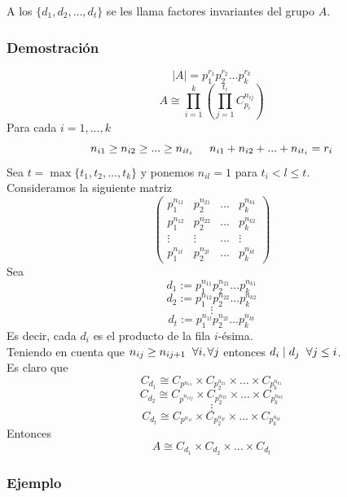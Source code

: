 \documentclass[11pt,a4paper]{article}
\begin{document}
A los $\{d_{1}, d_{2}, ..., d_{t}\}$ se les llama factores invariantes del grupo $A$.

\subsubsection*{Demostración}

$$|A| = p_{1}^{r_{1}} p_{2}^{r_{2}} ... p_{k}^{r_{k}}$$
$$A \cong \prod_{i=1}^{k} (\prod_{j=1}^{t_{i}} C_{p_{i}}^{n_{ij}})$$
Para cada $i = 1, ..., k$
$$n_{i1} \geq n_{i2} \geq ... \geq n_{it_{i}} \hspace{0.5cm} n_{i1} + n_{i2} + ... + n_{it_{i}} = r_{i}$$
Sea $t = \max\{t_{1}, t_{2}, ..., t_{k}\}$ y ponemos $n_{il} = 1$ para $t_{i} < l \leq t$. \\
Consideramos la siguiente matriz
\begin{equation*}
\begin{pmatrix}
p_{1}^{n_{11}} & p_{2}^{n_{21}} & ... & p_{k}^{n_{k1}} \\
p_{1}^{n_{12}} & p_{2}^{n_{22}} & ... & p_{k}^{n_{k2}}\\
\vdots & \vdots & ... & \vdots \\
p_{1}^{n_{1t}} & p_{2}^{n_{2t}} & ... & p_{k}^{n_{kt}} 
\end{pmatrix}
\end{equation*}
Sea
$$d_{1} := p_{1}^{n_{11}} p_{2}^{n_{21}} ... p_{k}^{n_{k1}}$$
$$d_{2} := p_{1}^{n_{12}} p_{2}^{n_{22}} ... p_{k}^{n_{k2}}$$
$$\vdots$$
$$d_{t} := p_{1}^{n_{1t}} p_{2}^{n_{2t}} ... p_{k}^{n_{kt}}$$
Es decir, cada $d_{i}$ es el producto de la fila $i$-ésima. \\
Teniendo en cuenta que $n_{ij} \geq n_{ij+1} \hspace{0.2cm} \forall i, \forall j$ entonces $d_{i} \mid d_{j} \hspace{0.2cm} \forall j \leq i$. \\
Es claro que
$$C_{d_{1}} \cong C_{p^{n_{11}}} \times C_{p_{2}^{n_{21}}} \times ... \times C_{p_{k}^{n_{k1}}}$$
$$C_{d_{2}} \cong C_{p^{n_{12j}}} \times C_{p_{2}^{n_{22}}} \times ... \times C_{p_{k}^{n_{k2}}}$$
$$\vdots$$
$$C_{d_{t}} \cong C_{p^{n_{1t}}} \times C_{p_{2}^{n_{2t}}} \times ... \times C_{p_{k}^{n_{kt}}}$$
Entonces
$$A \cong C_{d_{1}} \times C_{d_{2}} \times ... \times C_{d_{t}}$$

\subsubsection*{Ejemplo}
\end{document}
